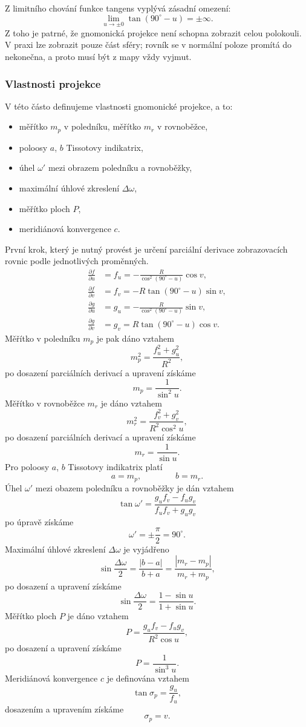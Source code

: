 Z limitního chování funkce tangens vyplývá zásadní omezení:
\[
\lim_{u \to \pm 0} \tan(90^\circ - u) = \pm \infty.
\]
Z toho je patrné, že gnomonická projekce není schopna zobrazit celou polokouli. V praxi lze zobrazit pouze část sféry; rovník se v normální poloze promítá do nekonečna, a proto musí být z mapy vždy vyjmut.
\newpage
\subsubsection{Vlastnosti projekce}
V této částo definujeme vlastnosti gnomonické projekce, a to: 
\begin{itemize}
    \item měřítko $m_p$ v poledníku, měřítko $m_r$ v rovnoběžce,
    \item poloosy $a$, $b$ Tissotovy indikatrix,
    \item úhel $\omega'$ mezi obrazem poledníku a rovnoběžky,
    \item maximální úhlové zkreslení $\Delta\omega$,
    \item měřítko ploch $P$,
    \item meridiánová konvergence $c$.
\end{itemize}
První krok, který je nutný provést je určení parciální derivace zobrazovacích rovnic podle jednotlivých proměnných.
\begin{align*}
\frac{\partial f}{\partial u} &= f_u = - \frac{R}{\cos^2 (90^\circ - u)} \cos v, \\
\frac{\partial f}{\partial v} &= f_v = -R \tan(90^\circ - u)\sin v,\\
\frac{\partial g}{\partial u} &= g_u = - \frac{R}{\cos^2 (90^\circ - u)} \sin v,\\
\frac{\partial g}{\partial v} &= g_v = R \tan(90^\circ - u)\cos v.
\end{align*}
Měřítko v poledníku $m_p$ je pak dáno vztahem
\[
m_p^2 = \frac{f_u^2+g_u^2}{R^2},
\]
po dosazení parciálních derivací a upravení získáme
\[
m_p = \frac{1}{\sin^2u}.
\]
Měřítko v rovnoběžce $m_r$ je dáno vztahem 
\[
m_r^2 = \frac{f_v^2+g_v^2}{R^2\cos^2u},
\]
po dosazení parciálních derivací a upravení získáme
\[
m_r = \frac{1}{\sin u}.
\]
Pro poloosy $a$, $b$ Tissotovy indikatrix platí
\[
a= m_p, \qquad \qquad b= m_r.
\]
Úhel $\omega'$ mezi obazem poledníku a rovnoběžky je dán vztahem
\[
\tan\omega' = \frac{g_uf_v-f_ug_v}{f_uf_v+g_ug_v}
\]
po úpravě získáme
\[
\omega' = \pm \frac{\pi}{2}= 90^\circ.
\]
Maximální úhlové zkreslení $\Delta\omega$ je vyjádřeno
\[
\sin\frac{\Delta\omega}{2}=\frac{|b-a|}{b+a}=\frac{|m_r-m_p|}{m_r+m_p},
\]
po dosazení a upravení získáme
\[
\sin\frac{\Delta\omega}{2}=\frac{1-\sin u}{1+\sin u}.
\]
Měřítko ploch $P$ je dáno vztahem
\[
P = \frac{g_uf_v-f_ug_v}{R^2\cos u},
\]
po dosazení a upravení získáme
\[
P=\frac{1}{\sin ^3u}.
\]
Meridiánová konvergence $c$ je definována vztahem 
\[
\tan\sigma_p = \frac{g_u}{f_u},
\]
dosazením a upravením získáme 
\[
\sigma_p = v.
\]

